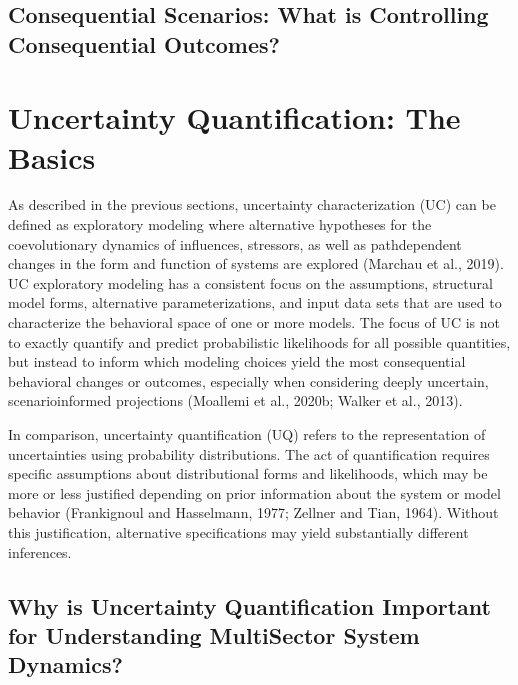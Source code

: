 \documentclass[letterpaper,10pt,english]{sphinxmanual}
\begin{document}
\section{Consequential Scenarios: What is Controlling Consequential Outcomes?}
\label{\detokenize{4_sensitivity_analysis_diagnostic_and_exploratory_modeling:consequential-scenarios-what-is-controlling-consequential-outcomes}}

\chapter{Uncertainty Quantification: The Basics}
\label{\detokenize{5_uncertainty_quantification_the_basics:uncertainty-quantification-the-basics}}\label{\detokenize{5_uncertainty_quantification_the_basics::doc}}
\sphinxAtStartPar
As described in the previous sections, uncertainty characterization (UC) can be defined as exploratory modeling where alternative hypotheses for the co\sphinxhyphen{}evolutionary dynamics of influences, stressors, as well as path\sphinxhyphen{}dependent changes in the form and function of systems are explored (Marchau et al., 2019). UC exploratory modeling has a consistent focus on the assumptions, structural model forms, alternative parameterizations, and input data sets that are used to characterize the behavioral space of one or more models. The focus of UC is not to exactly quantify and predict probabilistic likelihoods for all possible quantities, but instead to inform which modeling choices yield the most consequential behavioral changes or outcomes, especially when considering deeply uncertain, scenario\sphinxhyphen{}informed projections (Moallemi et al., 2020b; Walker et al., 2013).

\sphinxAtStartPar
In comparison, uncertainty quantification (UQ) refers to the representation of uncertainties using probability distributions. The act of quantification requires specific assumptions about distributional forms and likelihoods, which may be more or less justified depending on prior information about the system or model behavior (Frankignoul and Hasselmann, 1977; Zellner and Tian, 1964). Without this justification, alternative specifications may yield substantially different inferences.


\section{Why is Uncertainty Quantification Important for Understanding MultiSector System Dynamics?}
\label{\detokenize{5_uncertainty_quantification_the_basics:why-is-uncertainty-quantification-important-for-understanding-multisector-system-dynamics}}
\end{document}
